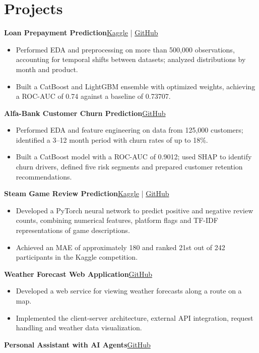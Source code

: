 \documentclass[a4paper,11pt]{article}
\newcommand{\project}[2]{\vspace{6pt}\textbf{#1}\hfill #2\par}
\newcommand{\gh}[1]{\href{#1}{GitHub}}
\newcommand{\kg}[1]{\href{#1}{Kaggle}}
\begin{document}
\section*{Projects}
\project{Loan Prepayment Prediction}{\kg{https://www.kaggle.com/competitions/cu-2025-scoring} | \gh{https://github.com/baranczov/ML_Competition_1}}
\begin{itemize}
\item Performed EDA and preprocessing on more than 500,000 observations, accounting for temporal shifts between datasets; analyzed distributions by month and product.
\item Built a CatBoost and LightGBM ensemble with optimized weights, achieving a ROC-AUC of 0.74 against a baseline of 0.73707.
\end{itemize}
\project{Alfa-Bank Customer Churn Prediction}{\gh{https://github.com/baranczov/ML_Project_1}}
\begin{itemize}
\item Performed EDA and feature engineering on data from 125,000 customers; identified a 3--12 month period with churn rates of up to 18\%.
\item Built a CatBoost model with a ROC-AUC of 0.9012; used SHAP to identify churn drivers, defined five risk segments and prepared customer retention recommendations.
\end{itemize}
\project{Steam Game Review Prediction}{\kg{https://www.kaggle.com/competitions/cu-advance-project/leaderboard?tab=public} | \gh{https://github.com/baranczov/ML_Competition_2}}
\begin{itemize}
\item Developed a PyTorch neural network to predict positive and negative review counts, combining numerical features, platform flags and TF-IDF representations of game descriptions.
\item Achieved an MAE of approximately 180 and ranked 21st out of 242 participants in the Kaggle competition.
\end{itemize}
\project{Weather Forecast Web Application}{\gh{https://github.com/baranczov/SWE_weather_app}}
\begin{itemize}
\item Developed a web service for viewing weather forecasts along a route on a map.
\item Implemented the client-server architecture, external API integration, request handling and weather data visualization.
\end{itemize}
\project{Personal Assistant with AI Agents}{\gh{https://github.com/Assirisss/ai-agents-hse}}
\end{document}
